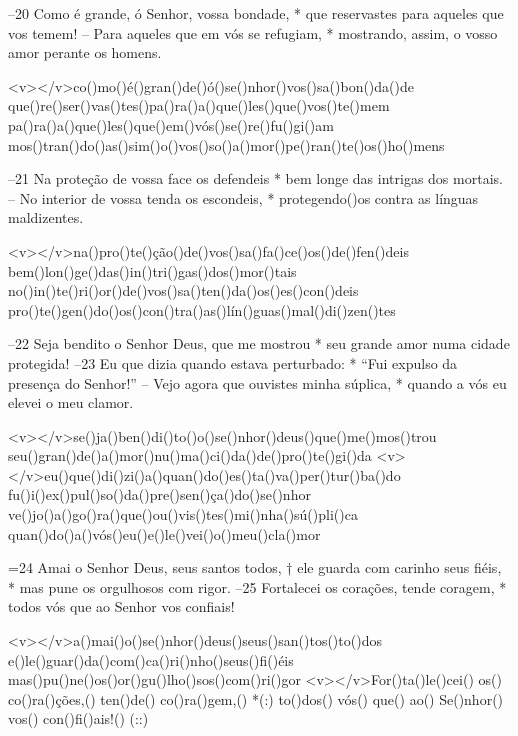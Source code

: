–20 Como é grande, ó Senhor, vossa bondade, *
que reservastes para aqueles que vos temem!
– Para aqueles que em vós se refugiam, *
mostrando, assim, o vosso amor perante os homens.

<v></v>co()mo()é()gran()de()ó()se()nhor()vos()sa()bon()da()de
que()re()ser()vas()tes()pa()ra()a()que()les()que()vos()te()mem
pa()ra()a()que()les()que()em()vós()se()re()fu()gi()am
mos()tran()do()as()sim()o()vos()so()a()mor()pe()ran()te()os()ho()mens

–21 Na proteção de vossa face os defendeis *
bem longe das intrigas dos mortais.
– No interior de vossa tenda os escondeis, *
protegendo()os contra as línguas maldizentes.

<v></v>na()pro()te()ção()de()vos()sa()fa()ce()os()de()fen()deis
bem()lon()ge()das()in()tri()gas()dos()mor()tais
no()in()te()ri()or()de()vos()sa()ten()da()os()es()con()deis
pro()te()gen()do()os()con()tra()as()lín()guas()mal()di()zen()tes

–22 Seja bendito o Senhor Deus, que me mostrou *
seu grande amor numa cidade protegida!
–23 Eu que dizia quando estava perturbado: *
“Fui expulso da presença do Senhor!”
– Vejo agora que ouvistes minha súplica, *
quando a vós eu elevei o meu clamor.

<v></v>se()ja()ben()di()to()o()se()nhor()deus()que()me()mos()trou
seu()gran()de()a()mor()nu()ma()ci()da()de()pro()te()gi()da
<v></v>eu()que()di()zi()a()quan()do()es()ta()va()per()tur()ba()do
fu()i()ex()pul()so()da()pre()sen()ça()do()se()nhor
ve()jo()a()go()ra()que()ou()vis()tes()mi()nha()sú()pli()ca
quan()do()a()vós()eu()e()le()vei()o()meu()cla()mor

=24 Amai o Senhor Deus, seus santos todos, †
ele guarda com carinho seus fiéis, *
mas pune os orgulhosos com rigor.
–25 Fortalecei os corações, tende coragem, *
todos vós que ao Senhor vos confiais!

<v>\VSup{}</v>a()mai()o()se()nhor()deus()seus()san()tos()to()dos
e()le()guar()da()com()ca()ri()nho()seus()fi()éis
mas()pu()ne()os()or()gu()lho()sos()com()ri()gor
<v>\VSup{}</v>For()ta()le()cei() os() co()ra()ções,() ten()de() co()ra()gem,() *(:)
to()dos() vós() que() ao() Se()nhor() vos() con()fi()ais!() (::)